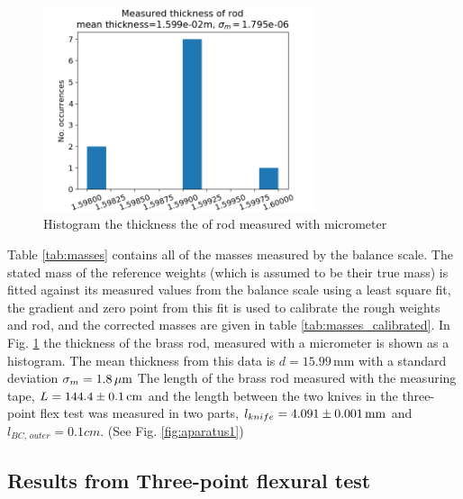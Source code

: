 \documentclass[11pt,a4paper]{article}
\begin{document}
    \begin{figure}[H]
      \center
      \includegraphics[width=8cm]{scripts/figs/thickdat.png}  
      \caption{Histogram the thickness the of rod measured with micrometer}
      \label{fig:thick} 
    \end{figure} 

    Table \ref{tab:masses} contains all of the masses measured by the balance scale. The stated mass of the reference weights (which is assumed to be their true mass) is fitted against its measured values from the balance scale using a least square fit, the gradient and zero point from this fit is used to calibrate the rough weights and rod, and the corrected masses are given in table \ref{tab:masses_calibrated}.
    \newline
    \newline
    In Fig. \ref{fig:thick} the thickness of the brass rod, measured with a micrometer is shown as a histogram. The mean thickness from this data is $d=15.99\,$mm with a standard deviation $\sigma_m = 1.8\,\mu \textup{m}$
    \newline
    The length of the brass rod measured with the measuring tape, $L=144.4\pm 0.1\,\textup{cm}$ and the length between the two knives in the three-point flex test was measured in two parts, $l_{knife}=4.091\pm 0.001\,\textup{mm}$ and $l_{BC,\,outer}=0.1cm$. (See Fig. \ref{fig:aparatus1})





  \subsection{Results from Three-point flexural test}
\end{document}
